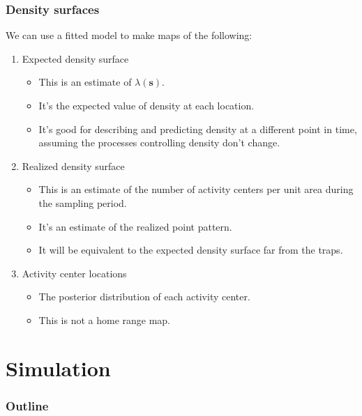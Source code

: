 \documentclass[color=usenames,dvipsnames]{beamer}\usepackage[]{graphicx}\usepackage[]{color}
\newcommand{\bs}{{\bm s}}
\newcommand{\bsi}{{\bm s}_i}
\begin{document}
\begin{frame}
  \frametitle{Density surfaces}
  \large
  We can use a fitted model to make maps of the following: 
  \begin{enumerate}
    \item<1-> Expected density surface%
    \begin{itemize}
      \item This is an estimate of $\lambda(\bs)$.
      \item It's the expected value of density at  each location.
      \item It's good for describing and predicting density at a
        different point in time, assuming the processes controlling
        density don't change.
    \end{itemize}
    \item<2-> Realized density surface%
      \begin{itemize}
        \item This is an estimate of the number of activity centers
          per unit area \alert{during the sampling period}.
        \item It's an estimate of the realized point pattern.
        \item It will be equivalent to the expected density surface
          far from the traps. 
      \end{itemize}
    \item<3-> Activity center locations%
      \begin{itemize}
        \item The posterior distribution of each activity center.
        \item This is not a home range map.
      \end{itemize}
  \end{enumerate}
\end{frame}



\section{Simulation}


\begin{frame}
  \frametitle{Outline}
  \Large
  \tableofcontents[currentsection]
\end{frame}
\end{document}
